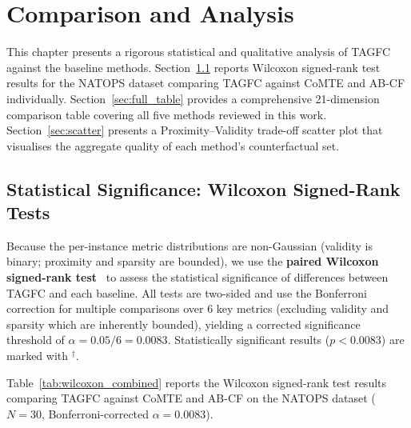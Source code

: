 \chapter{Comparison and Analysis}

This chapter presents a rigorous statistical and qualitative analysis of TAGFC against the baseline methods. Section~\ref{sec:wilcoxon} reports Wilcoxon signed-rank test results for the NATOPS dataset comparing TAGFC against CoMTE and AB-CF individually. Section~\ref{sec:full_table} provides a comprehensive 21-dimension comparison table covering all five methods reviewed in this work. Section~\ref{sec:scatter} presents a Proximity–Validity trade-off scatter plot that visualises the aggregate quality of each method's counterfactual set.

\section{Statistical Significance: Wilcoxon Signed-Rank Tests}
\label{sec:wilcoxon}

Because the per-instance metric distributions are non-Gaussian (validity is binary; proximity and sparsity are bounded), we use the \textbf{paired Wilcoxon signed-rank test}~\cite{wilcoxon1945individual} to assess the statistical significance of differences between TAGFC and each baseline. All tests are two-sided and use the Bonferroni correction for multiple comparisons over 6 key metrics (excluding validity and sparsity which are inherently bounded), yielding a corrected significance threshold of $\alpha = 0.05 / 6 = 0.0083$. Statistically significant results ($p < 0.0083$) are marked with $^\dagger$.

Table~\ref{tab:wilcoxon_combined} reports the Wilcoxon signed-rank test results comparing TAGFC against CoMTE and AB-CF on the NATOPS dataset ($N=30$, Bonferroni-corrected $\alpha=0.0083$).


